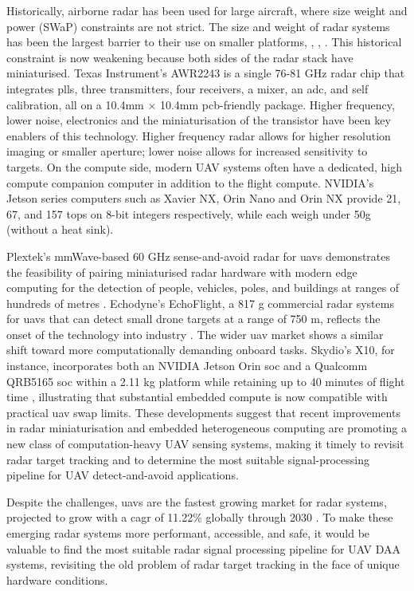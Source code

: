 Historically, airborne radar has been used for large aircraft, where size weight and 
power (SWaP) constraints are not strict. The size and weight of radar systems has been
the largest barrier to their use on smaller platforms, \cite{Lies2020}, \cite{McLain2015},
\cite{Wang2016}. This historical constraint is now weakening because both sides of the
radar stack have miniaturised. Texas Instrument's AWR2243 is a single 76-81 GHz radar chip
that integrates \gls{pll}s, three transmitters, four receivers, a mixer, an
\gls{adc}, and self calibration, all on a 10.4mm $\times$ 10.4mm \gls{pcb}-friendly package. Higher frequency, lower noise, electronics and the miniaturisation of 
the transistor have been key enablers of this technology. Higher frequency radar allows for
higher resolution imaging or smaller aperture; lower noise allows for increased
sensitivity to targets. On the compute side, modern UAV systems often have a dedicated, 
high compute companion computer in addition to the flight compute. NVIDIA’s Jetson series
computers such as Xavier NX, Orin Nano and Orin NX provide 21, 67, and 157 \gls{tops}
on 8-bit integers respectively, while each weigh under
50g (without a heat sink).

Plextek's mmWave-based 60 GHz sense-and-avoid radar for \gls{uav}s demonstrates the feasibility
of pairing miniaturised radar hardware with modern edge computing for the detection of
people, vehicles, poles, and buildings at ranges of hundreds of metres \cite{Plextek2024}. Echodyne’s
EchoFlight, a 817 g commercial radar systems for \gls{uav}s that can detect small drone targets
at a range of 750 m, reflects the onset of the technology into industry \cite{Echodyne2024}. The wider \gls{uav} market shows a similar shift toward more computationally
demanding onboard tasks. Skydio’s X10, for instance, incorporates both an NVIDIA Jetson
Orin \gls{soc} and a Qualcomm QRB5165 \gls{soc} within a 2.11 kg platform while retaining up to 40
minutes of flight time \cite{Skydio2023}, illustrating that substantial embedded compute is now
compatible with practical \gls{uav} \gls{swap} limits. These developments suggest that recent 
improvements in radar miniaturisation and embedded heterogeneous computing are promoting a 
new class of computation-heavy UAV sensing systems, making it timely to revisit radar 
target tracking and to determine the most suitable signal-processing pipeline for UAV 
detect-and-avoid applications. 

Despite the challenges, \gls{uav}s are the fastest growing market for radar systems, projected
to grow with a \gls{cagr} of 11.22\% globally through 2030 \cite{mordor_airborne_radars_market_2025}. To make these emerging radar systems more 
performant, accessible, and safe, it would be valuable to find the most suitable radar 
signal processing pipeline for UAV DAA systems, revisiting the old problem of radar target 
tracking in the face of unique hardware conditions.

